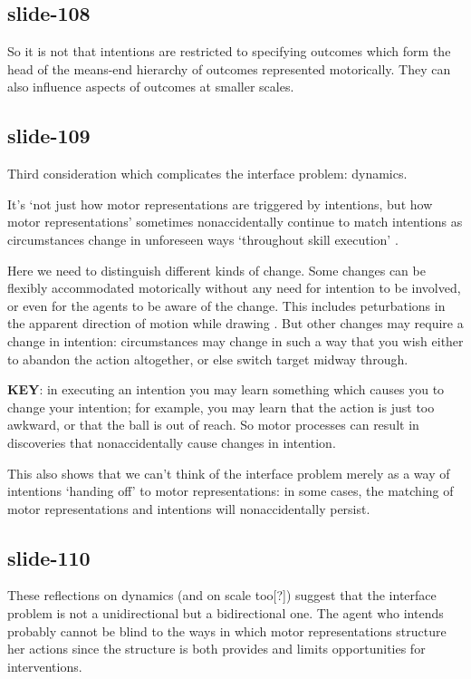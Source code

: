 \documentclass[12pt,\papersize]{extarticle}
\begin{document}
\subsection{slide-108}
So it is not that intentions are restricted to specifying outcomes which form the head of the means-end
hierarchy of outcomes represented motorically.
They can also influence aspects of outcomes at smaller scales.
 
\subsection{slide-109}
Third consideration which complicates the interface problem: dynamics.
 
It’s ‘not just how motor representations are triggered by intentions, but how motor
representations’ sometimes nonaccidentally continue to match intentions as circumstances change in unforeseen ways ‘throughout
skill execution’
\citep[p.~19]{fridland:2016_skill}.
 
Here we need to distinguish different kinds of change.
Some changes can be flexibly accommodated motorically without any need for intention
to be involved, or even for the agents to be aware of the change. This includes peturbations
in the apparent direction of motion while drawing \citep{fourneret:1998_limited}.
But other changes may require a change in intention: circumstances may change in such a way
that you wish either to abandon the action altogether, or else switch target midway through.
 
\textbf{KEY}: in executing an intention you may learn something which causes you to change
your intention; for example, you may learn that the action is just too awkward, or that the
ball is out of reach. So motor processes can result in discoveries that nonaccidentally cause
changes in intention.
 
This also shows that we can’t think of the interface problem merely as a way of intentions
‘handing off’ to motor representations: in some cases, the matching of motor representations
and intentions will nonaccidentally persist.
 
\subsection{slide-110}
These reflections on dynamics (and on scale too[?]) suggest that the interface problem
is not a unidirectional but a bidirectional one. The agent who intends probably cannot be blind to
the ways in which motor representations structure her actions since the structure is both provides
and limits opportunities for interventions.
 
\end{document}

